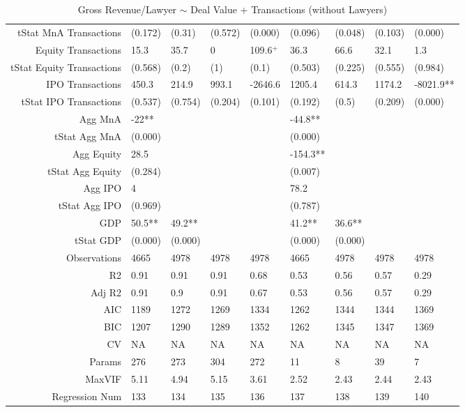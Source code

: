 \begin{table}[ht]
\begin{tabular}{rllllllll}
  tStat MnA Transactions & (0.172) & (0.31) & (0.572) & (0.000) & (0.096) & (0.048) & (0.103) & (0.000) \\ 
  Equity Transactions & 15.3 & 35.7 & 0 & 109.6$^{+}$ & 36.3 & 66.6 & 32.1 & 1.3 \\ 
  tStat Equity Transactions & (0.568) & (0.2) & (1) & (0.1) & (0.503) & (0.225) & (0.555) & (0.984) \\ 
  IPO Transactions & 450.3 & 214.9 & 993.1 & -2646.6 & 1205.4 & 614.3 & 1174.2 & -8021.9** \\ 
  tStat IPO Transactions & (0.537) & (0.754) & (0.204) & (0.101) & (0.192) & (0.5) & (0.209) & (0.000) \\ 
  Agg MnA & -22** &  &  &  & -44.8** &  &  &  \\ 
  tStat Agg MnA & (0.000) &  &  &  & (0.000) &  &  &  \\ 
  Agg Equity & 28.5 &  &  &  & -154.3** &  &  &  \\ 
  tStat Agg Equity & (0.284) &  &  &  & (0.007) &  &  &  \\ 
  Agg IPO & 4 &  &  &  & 78.2 &  &  &  \\ 
  tStat Agg IPO & (0.969) &  &  &  & (0.787) &  &  &  \\ 
  GDP & 50.5** & 49.2** &  &  & 41.2** & 36.6** &  &  \\ 
  tStat GDP & (0.000) & (0.000) &  &  & (0.000) & (0.000) &  &  \\ 
  Observations & 4665 & 4978 & 4978 & 4978 & 4665 & 4978 & 4978 & 4978 \\ 
  R2 & 0.91 & 0.91 & 0.91 & 0.68 & 0.53 & 0.56 & 0.57 & 0.29 \\ 
  Adj R2 & 0.91 & 0.9 & 0.91 & 0.67 & 0.53 & 0.56 & 0.57 & 0.29 \\ 
  AIC & 1189 & 1272 & 1269 & 1334 & 1262 & 1344 & 1344 & 1369 \\ 
  BIC & 1207 & 1290 & 1289 & 1352 & 1262 & 1345 & 1347 & 1369 \\ 
  CV & NA & NA & NA & NA & NA & NA & NA & NA \\ 
  Params & 276 & 273 & 304 & 272 & 11 & 8 & 39 & 7 \\ 
  MaxVIF & 5.11 & 4.94 & 5.15 & 3.61 & 2.52 & 2.43 & 2.44 & 2.43 \\ 
  Regression Num & 133 & 134 & 135 & 136 & 137 & 138 & 139 & 140 \\ 
   \hline
\end{tabular}
\caption{Gross Revenue/Lawyer $\sim$ Deal Value + Transactions (without Lawyers)} 
\end{table}
